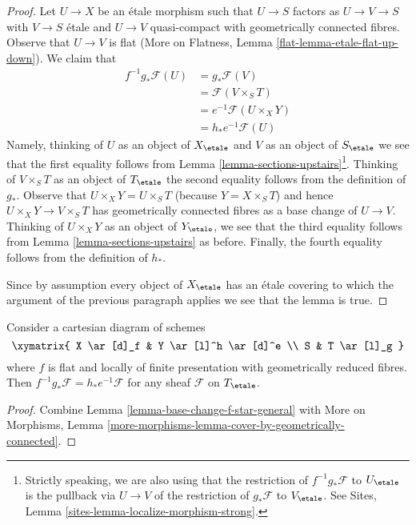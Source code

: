 \begin{proof}
Let $U \to X$ be an \'etale morphism such that $U \to S$ factors as
$U \to V \to S$ with $V \to S$ \'etale and $U \to V$ quasi-compact
with geometrically connected fibres. Observe that $U \to V$ is flat
(More on Flatness, Lemma \ref{flat-lemma-etale-flat-up-down}).
We claim that
\begin{align*}
f^{-1}g_*\mathcal{F}(U)
& = g_*\mathcal{F}(V) \\
& = \mathcal{F}(V \times_S T) \\
& = e^{-1}\mathcal{F}(U \times_X Y) \\
& = h_*e^{-1}\mathcal{F}(U)
\end{align*}
Namely, thinking of $U$ as an object of $X_\etale$ and
$V$ as an object of $S_\etale$ we see that the first equality
follows from Lemma \ref{lemma-sections-upstairs}\footnote{Strictly
speaking, we are also using that the restriction of $f^{-1}g_*\mathcal{F}$
to $U_\etale$ is the pullback via $U \to V$ of the restriction of
$g_*\mathcal{F}$ to $V_\etale$. See
Sites, Lemma \ref{sites-lemma-localize-morphism-strong}.}.
Thinking of $V \times_S T$ as an object of $T_\etale$
the second equality follows from the definition of $g_*$.
Observe that $U \times_X Y = U \times_S T$ (because $Y = X \times_S T$)
and hence $U \times_X Y \to V \times_S T$
has geometrically connected fibres as a base change of $U \to V$.
Thinking of $U \times_X Y$ as an object of $Y_\etale$, we see that
the third equality  follows from Lemma \ref{lemma-sections-upstairs}
as before. Finally, the fourth equality follows from the definition
of $h_*$.

\medskip\noindent
Since by assumption every object of $X_\etale$ has an \'etale
covering to which the argument of the previous paragraph applies
we see that the lemma is true.
\end{proof}

\begin{lemma}
\label{lemma-fppf-reduced-fibres-base-change-f-star}
Consider a cartesian diagram of schemes
$$
\xymatrix{
X \ar[d]_f & Y \ar[l]^h \ar[d]^e \\
S & T \ar[l]_g
}
$$
where $f$ is flat and locally of finite presentation
with geometrically reduced fibres.
Then $f^{-1}g_*\mathcal{F} = h_*e^{-1}\mathcal{F}$
for any sheaf $\mathcal{F}$ on $T_\etale$.
\end{lemma}

\begin{proof}
Combine Lemma \ref{lemma-base-change-f-star-general} with
More on Morphisms, Lemma
\ref{more-morphisms-lemma-cover-by-geometrically-connected}.
\end{proof}

